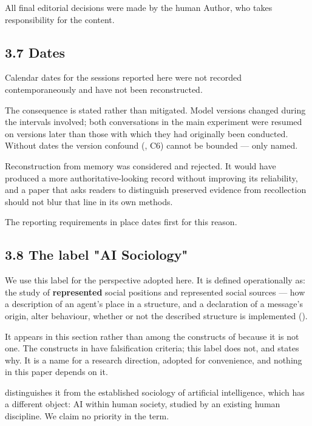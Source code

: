 All final editorial decisions were made by the human Author, who takes responsibility for the content.


\subsection*{3.7 Dates}
\label{sec:en:3.7}

Calendar dates for the sessions reported here were not recorded contemporaneously and have not been reconstructed.

The consequence is stated rather than mitigated. Model versions changed during the intervals involved; both conversations in the main experiment were resumed on versions later than those with which they had originally been conducted. Without dates the version confound (, C6) cannot be bounded — only named.

Reconstruction from memory was considered and rejected. It would have produced a more authoritative-looking record without improving its reliability, and a paper that asks readers to distinguish preserved evidence from recollection should not blur that line in its own methods.

The reporting requirements in  place dates first for this reason.


\subsection*{3.8 The label "AI Sociology"}
\label{sec:en:3.8}

We use this label for the perspective adopted here. It is defined operationally as: the study of \textbf{represented} social positions and represented social sources — how a description of an agent's place in a structure, and a declaration of a message's origin, alter behaviour, whether or not the described structure is implemented ().

It appears in this section rather than among the constructs of  because it is not one. The constructs in  have falsification criteria; this label does not, and  states why. It is a name for a research direction, adopted for convenience, and nothing in this paper depends on it.

 distinguishes it from the established sociology of artificial intelligence, which has a different object: AI within human society, studied by an existing human discipline. We claim no priority in the term.


